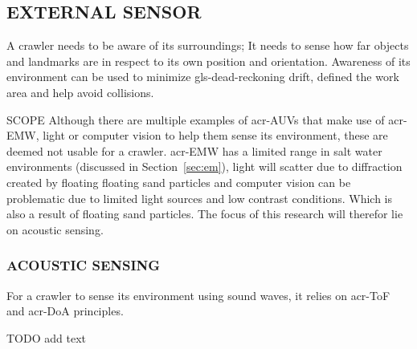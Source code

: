\subsection{EXTERNAL SENSOR}\label{sec:sensorenvironment}

A crawler needs to be aware of its surroundings; It needs to sense how far objects and landmarks are in respect to its
own position and orientation. Awareness of its environment can be used to minimize \gls{gls-dead-reckoning} drift,
defined the work area and help avoid collisions.

\begin{RoyalNote}{SCOPE}
	Although there are multiple examples of \gls{acr-AUV}s that make use of \gls{acr-EMW}, light or computer vision to
	help  them sense its environment, these are deemed not usable for a crawler. \gls{acr-EMW} has a limited range in
	salt water  environments (discussed in Section~\ref{sec:em}), light will scatter due to diffraction created by floating
	floating sand  particles and computer vision can be problematic due to limited light sources and low contrast
	conditions. Which is  also a result of floating sand particles. The focus of this research will therefor lie on
	acoustic sensing.
\end{RoyalNote}

\subsubsection{ACOUSTIC SENSING}

For a crawler to sense its environment using sound waves, it relies on \gls{acr-ToF} and \gls{acr-DoA} principles.

TODO add text
%
%
%
%
%
%
